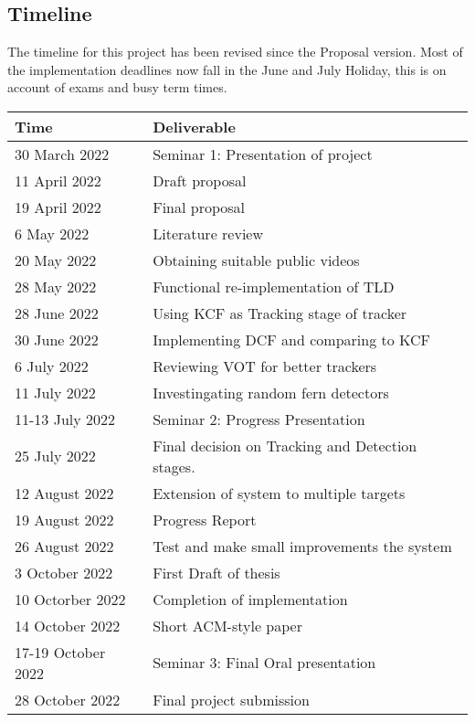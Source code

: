 \subsection{Timeline}
The timeline for this project has been revised since the Proposal version.
Most of the implementation deadlines now fall in the June and July Holiday, this is on account of exams and busy term times.
\begin{center}
  \begin{tabular}{l l}
    \toprule
      Time & Deliverable\\
    \midrule
      30 March 2022     & Seminar 1: Presentation of project\\
      11 April 2022     & Draft proposal\\
      19 April 2022     & Final proposal\\
      6 May 2022        & Literature review\\
      20 May 2022       & Obtaining suitable public videos\\
      28 May 2022       & Functional re-implementation of TLD\\
      28 June 2022      & Using KCF as Tracking stage of tracker\\
      30 June 2022      & Implementing DCF and comparing to KCF\\
      6 July 2022       & Reviewing VOT for better trackers\\
      11 July 2022      & Investingating random fern detectors\\
      11-13 July 2022   & Seminar 2: Progress Presentation\\
      25 July 2022      & Final decision on Tracking and Detection stages.\\
      12 August 2022    & Extension of system to multiple targets\\
      19 August 2022    & Progress Report\\
      26 August 2022    & Test and make small improvements the system\\
      3 October 2022    & First Draft of thesis\\
      10 Octorber 2022  & Completion of implementation\\
      14 October 2022   & Short ACM-style paper\\
      17-19 October 2022& Seminar 3: Final Oral presentation\\
      28 October 2022   & Final project submission\\
    \bottomrule
  \end{tabular}
\end{center}
